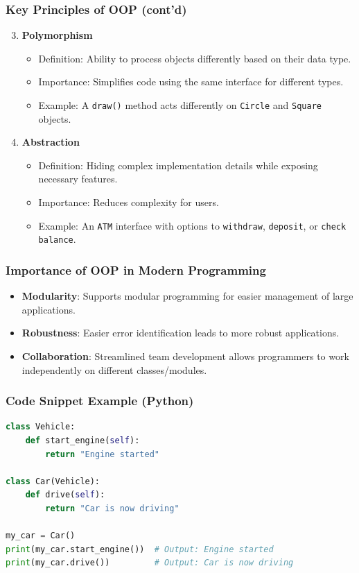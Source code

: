 \documentclass{beamer}
\begin{document}
\begin{frame}[fragile]
    \frametitle{Key Principles of OOP (cont'd)}
    \begin{enumerate}
        \setcounter{enumi}{2} %
        \item \textbf{Polymorphism}
            \begin{itemize}
                \item Definition: Ability to process objects differently based on their data type.
                \item Importance: Simplifies code using the same interface for different types.
                \item Example: A \texttt{draw()} method acts differently on \texttt{Circle} and \texttt{Square} objects.
            \end{itemize}

        \item \textbf{Abstraction}
            \begin{itemize}
                \item Definition: Hiding complex implementation details while exposing necessary features.
                \item Importance: Reduces complexity for users.
                \item Example: An \texttt{ATM} interface with options to \texttt{withdraw}, \texttt{deposit}, or \texttt{check balance}.
            \end{itemize}
    \end{enumerate}
\end{frame}

\begin{frame}[fragile]
    \frametitle{Importance of OOP in Modern Programming}
    \begin{itemize}
        \item \textbf{Modularity}: Supports modular programming for easier management of large applications.
        \item \textbf{Robustness}: Easier error identification leads to more robust applications.
        \item \textbf{Collaboration}: Streamlined team development allows programmers to work independently on different classes/modules.
    \end{itemize}
\end{frame}

\begin{frame}[fragile]
    \frametitle{Code Snippet Example (Python)}
    \begin{lstlisting}[language=Python]
class Vehicle:
    def start_engine(self):
        return "Engine started"

class Car(Vehicle):
    def drive(self):
        return "Car is now driving"

my_car = Car()
print(my_car.start_engine())  # Output: Engine started
print(my_car.drive())         # Output: Car is now driving
    \end{lstlisting}
\end{frame}
\end{document}
